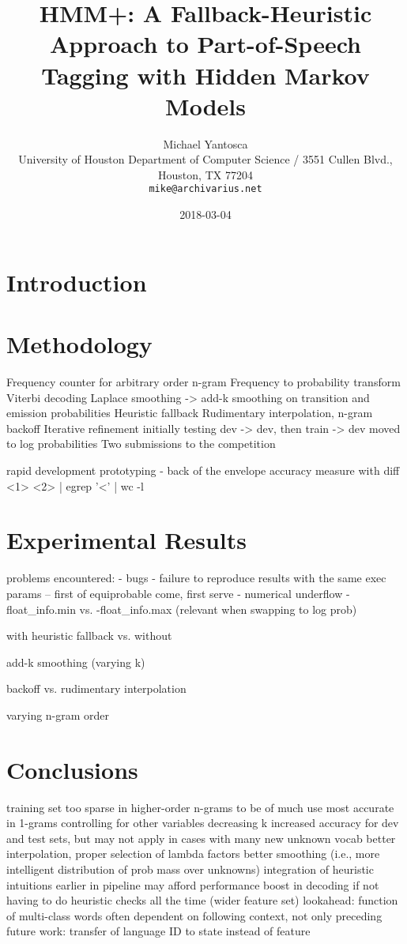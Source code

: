 \documentclass[11pt,a4paper]{article}
\title{HMM+: A Fallback-Heuristic Approach to Part-of-Speech Tagging with Hidden Markov Models}
\author{Michael Yantosca \\
  University of Houston Department of Computer Science / 3551 Cullen Blvd., Houston, TX 77204 \\
  {\tt mike@archivarius.net} \\}
\date{2018-03-04}
\begin{document}
\maketitle
\begin{abstract}
\end{abstract}

\section{Introduction}

\section{Methodology}

Frequency counter for arbitrary order n-gram
Frequency to probability transform
Viterbi decoding
Laplace smoothing -> add-k smoothing on transition and emission probabilities
Heuristic fallback
Rudimentary interpolation, n-gram backoff
Iterative refinement initially testing dev -> dev, then train -> dev
moved to log probabilities
Two submissions to the competition

rapid development prototyping - back of the envelope accuracy measure with diff <1> <2> | egrep '<' | wc -l

\section{Experimental Results}

problems encountered:
- bugs
- failure to reproduce results with the same exec params
-- first of equiprobable come, first serve
- numerical underflow
- float\_info.min vs. -float\_info.max (relevant when swapping to log prob)

with heuristic fallback vs. without

add-k smoothing (varying k)

backoff vs. rudimentary interpolation

varying n-gram order

\section{Conclusions}

training set too sparse in higher-order n-grams to be of much use
most accurate in 1-grams controlling for other variables
decreasing k increased accuracy for dev and test sets, but may not apply in cases with many new unknown vocab
better interpolation, proper selection of lambda factors
better smoothing (i.e., more intelligent distribution of prob mass over unknowns)
integration of heuristic intuitions earlier in pipeline may afford performance boost in decoding if not having to do heuristic checks all the time (wider feature set)
lookahead: function of multi-class words often dependent on following context, not only preceding
future work: transfer of language ID to state instead of feature
\end{document}

